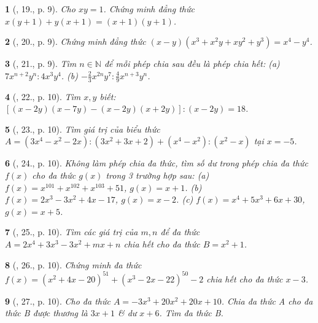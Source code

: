 \documentclass{article}
\newtheorem{baitoan}{}
\begin{document}
\begin{baitoan}[\cite{Tuyen_Toan_8}, 19., p. 9]
	Cho $xy = 1$. Chứng minh đẳng thức $x(y + 1) + y(x + 1) = (x + 1)(y + 1)$.
\end{baitoan}

\begin{baitoan}[\cite{Tuyen_Toan_8}, 20., p. 9]
	Chứng minh đẳng thức $(x - y)(x^3 + x^2y + xy^2 + y^3) = x^4 - y^4$.
\end{baitoan}

\begin{baitoan}[\cite{Tuyen_Toan_8}, 21., p. 9]
	Tìm $n\in\mathbb{N}$ để mỗi phép chia sau đều là phép chia hết: (a) $7x^{n+2}y^n:4x^3y^4$. (b) $-\frac{2}{3}x^{2n}y^7:\frac{4}{9}x^{n+3}y^n$.
\end{baitoan}

\begin{baitoan}[\cite{Tuyen_Toan_8}, 22., p. 10]
	Tìm $x,y$ biết: $[(x - 2y)(x - 7y) - (x - 2y)(x + 2y)]:(x - 2y) = 18$.
\end{baitoan}

\begin{baitoan}[\cite{Tuyen_Toan_8}, 23., p. 10]
	Tìm giá trị của biểu thức $A = (3x^4 - x^2 - 2x):(3x^2 + 3x + 2) + (x^4 - x^2):(x^2 - x)$ tại $x = -5$.
\end{baitoan}

\begin{baitoan}[\cite{Tuyen_Toan_8}, 24., p. 10]
	Không làm phép chia đa thức, tìm số dư trong phép chia đa thức $f(x)$ cho đa thức $g(x)$ trong 3 trường hợp sau: (a) $f(x) = x^{101} + x^{102} + x^{103} + 51$, $g(x) = x + 1$. (b) $f(x) = 2x^3 - 3x^2 + 4x - 17$, $g(x) = x - 2$. (c) $f(x) = x^4 + 5x^3 + 6x + 30$, $g(x) = x + 5$.
\end{baitoan}

\begin{baitoan}[\cite{Tuyen_Toan_8}, 25., p. 10]
	Tìm các giá trị của $m,n$ để đa thức $A = 2x^4 + 3x^3 - 3x^2 + mx + n$ chia hết cho đa thức $B = x^2 + 1$.
\end{baitoan}

\begin{baitoan}[\cite{Tuyen_Toan_8}, 26., p. 10]
	Chứng minh đa thức $f(x) = (x^2 + 4x - 20)^{51} + (x^3 - 2x - 22)^{50} - 2$ chia hết cho đa thức $x - 3$.
\end{baitoan}

\begin{baitoan}[\cite{Tuyen_Toan_8}, 27., p. 10]
	Cho đa thức $A = -3x^3 + 20x^2 + 20x + 10$. Chia đa thức A cho đa thức B được thương là $3x + 1$ \& dư $x + 6$. Tìm đa thức B.
\end{baitoan}
\end{document}
